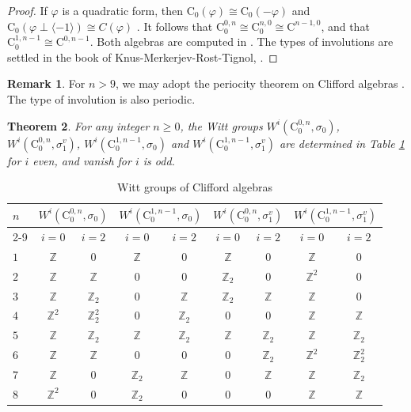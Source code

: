 \documentclass[psamsfonts]{amsart}
\theoremstyle{plain}
\newtheorem{theo}{Theorem}[section]
\theoremstyle{theorem}
\theoremstyle{definition}
\newtheorem{remark}[theo]{Remark}
\newcommand{\C}{\mathrm{C}}
\newcommand{\Z}{\mathbb{Z}}
\newcommand{\W}{W}
\begin{document}
	
	\begin{proof}
		If $\varphi$ is a quadratic form, then $\C_0(\varphi) \cong \C_0(-\varphi)$ and $\C_0(\varphi \perp \langle  -1 \rangle) \cong C(\varphi)$ \cite[Lemma 4.5]{Swan}. It follows that $\C_0^{0,n} \cong \C^{n,0}_0 \cong \C^{n-1,0}$, and that $\C^{1,n-1}_0 \cong \C^{0,n-1} $. Both algebras are computed in \cite{ABS63}. The types of involutions are settled in the  book of Knus-Merkerjev-Rost-Tignol, \cite{KMRT98}. 
	\end{proof}
	\begin{remark}
		For $n>9$, we may adopt the periocity theorem on Clifford algebras \cite[Section 4]{ABS63}. The type of involution is also periodic.  
	\end{remark}
\begin{theo}\label{thm:Wittcliff} For any integer $n \ge 0$, the Witt groups $\W^i(\C_0^{0,n},\sigma_0)$, $\W^i(\C_0^{0,n},\sigma_1^v)$, $\W^i(\C_0^{1,n-1},\sigma_0)$ and $\W^i(\C_0^{1,n-1},\sigma_1^v)$ are determined in Table \ref{table:sigma_combined} for $i$ even, and vanish for $i$ is odd. 
\end{theo}	
	\begin{table}[H]
		\footnotesize \centering
		\renewcommand{\arraystretch}{1.3}
		\begin{tabular}{|l||c|c|c|c||c|c|c|c|}
			\hline
			\multirow{2}{*}{$n $} & \multicolumn{2}{c|}{$\W^i(\C_0^{0,n}, \sigma_0)$} & \multicolumn{2}{c||}{$\W^i(\C_0^{1,n-1}, \sigma_0)$} & \multicolumn{2}{c|}{$\W^i(\C_0^{0,n}, \sigma_1^v)$} & \multicolumn{2}{c|}{$\W^i(\C_0^{1,n-1}, \sigma_1^v)$} \\
			\cline{2-9}
			& $i = 0$ & $i = 2$ & $i = 0$ & $i = 2$ & $i = 0$ & $i = 2$ & $i = 0$ & $i = 2$ \\
			\hline \hline
			$1$ & $\Z$   & $0$        & $\Z$   & $0$    & $\Z$   & $0$    & $\Z$   & $0$        \\
			\hline
			$2$ & $\Z$   & $\Z$       & $0$    & $0$    & $\Z_2$ & $0$    & $\Z^2$ & $0$        \\
			\hline
			$3$ & $\Z$   & $\Z_2$     & $0$    & $\Z$   & $\Z_2$ & $\Z$   & $\Z$   & $0$        \\
			\hline
			$4$ & $\Z^2$ & $\Z_2^2$ & $0$    & $\Z_2$ & $0$    & $0$    & $\Z$   & $\Z$       \\
			\hline
			$5$ & $\Z$   & $\Z_2$     & $\Z$   & $\Z_2$ & $\Z$   & $\Z_2$ & $\Z$   & $\Z_2$     \\
			\hline
			$6$ & $\Z$   & $\Z$       & $0$    & $0$    & $0$    & $\Z_2$ & $\Z^2$ & $\Z_2^2$ \\
			\hline
			$7$ & $\Z$   & $0$        & $\Z_2$ & $\Z$   & $0$    & $\Z$   & $\Z$   & $\Z_2$     \\
			\hline
			$8$ & $\Z^2$ & $0$        & $\Z_2$ & $0$    & $0$    & $0$    & $\Z$   & $\Z$       \\
			\hline
		\end{tabular}
		\caption{Witt groups of Clifford algebras}
		\label{table:sigma_combined}
	\end{table}
\end{document}
